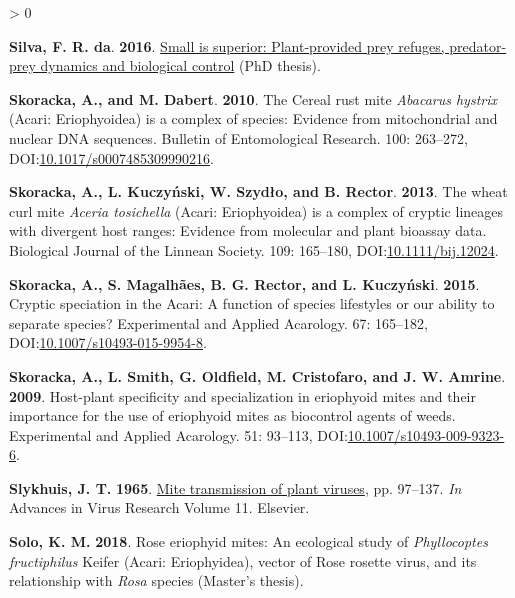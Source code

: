 \documentclass{ufdissertation}[overrideChapters] %
\newlength{\cslhangindent}
\newenvironment{CSLReferences}[2] %
 {%
  \setlength{\parindent}{0pt}
  \ifodd #1 \everypar{\setlength{\hangindent}{\cslhangindent}}\ignorespaces\fi
  \ifnum #2 > 0
  \setlength{\parskip}{#2\baselineskip}
  \fi
 }%
 {}
\begin{document}
{\begin{CSLReferences}{1}{1}
\leavevmode{}%
\textbf{Silva, F. R. da}. \textbf{2016}. \href{https://hdl.handle.net/11245/1.536208}{Small is superior: Plant-provided prey refuges, predator-prey dynamics and biological control} (PhD thesis).

\leavevmode{}%
\textbf{Skoracka, A., and M. Dabert}. \textbf{2010}. The {Cereal rust mite} {\emph{Abacarus hystrix}} ({Acari}: {Eriophyoidea}) is a complex of species: Evidence from mitochondrial and nuclear {DNA} sequences. Bulletin of Entomological Research. 100: 263--272, DOI:\href{https://doi.org/10.1017/s0007485309990216}{10.1017/s0007485309990216}.

\leavevmode{}%
\textbf{Skoracka, A., L. Kuczyński, W. Szydło, and B. Rector}. \textbf{2013}. The wheat curl mite {\emph{Aceria tosichella}} ({Acari: Eriophyoidea}) is a complex of cryptic lineages with divergent host ranges: Evidence from molecular and plant bioassay data. Biological Journal of the Linnean Society. 109: 165--180, DOI:\href{https://doi.org/10.1111/bij.12024}{10.1111/bij.12024}.

\leavevmode{}%
\textbf{Skoracka, A., S. Magalhães, B. G. Rector, and L. Kuczyński}. \textbf{2015}. Cryptic speciation in the {Acari}: A function of species lifestyles or our ability to separate species? Experimental and Applied Acarology. 67: 165--182, DOI:\href{https://doi.org/10.1007/s10493-015-9954-8}{10.1007/s10493-015-9954-8}.

\leavevmode{}%
\textbf{Skoracka, A., L. Smith, G. Oldfield, M. Cristofaro, and J. W. Amrine}. \textbf{2009}. Host-plant specificity and specialization in eriophyoid mites and their importance for the use of eriophyoid mites as biocontrol agents of weeds. Experimental and Applied Acarology. 51: 93--113, DOI:\href{https://doi.org/10.1007/s10493-009-9323-6}{10.1007/s10493-009-9323-6}.

\leavevmode{}%
\textbf{Slykhuis, J. T.} \textbf{1965}. \href{https://doi.org/10.1016/s0065-3527(08)60544-8}{Mite transmission of plant viruses}, pp. 97--137. \emph{In} Advances in Virus Research Volume 11. Elsevier.

\leavevmode{}%
\textbf{Solo, K. M.} \textbf{2018}. Rose eriophyid mites: An ecological study of {\emph{Phyllocoptes fructiphilus}} {Keifer} {({Acari}: {Eriophyidea})}, vector of {Rose rosette virus}, and its relationship with {\emph{Rosa}} species (Master's thesis).


\end{CSLReferences}}
\end{document}
